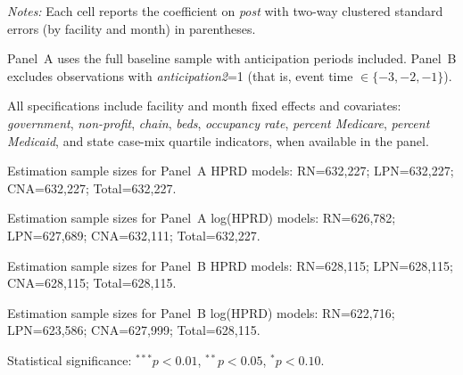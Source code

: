 \begin{table}[!ht]
\begin{threeparttable}
\begin{tablenotes}[flushleft]
\footnotesize
\item \textit{Notes:} Each cell reports the coefficient on \textit{post} with two-way clustered standard errors (by facility and month) in parentheses.
\item Panel~A uses the full baseline sample with anticipation periods included. Panel~B excludes observations with \textit{anticipation2}=1 (that is, event time $\in \{-3,-2,-1\}$).
\item All specifications include facility and month fixed effects and covariates: \textit{government}, \textit{non-profit}, \textit{chain}, \textit{beds}, \textit{occupancy rate}, \textit{percent Medicare}, \textit{percent Medicaid}, and state case-mix quartile indicators, when available in the panel.
\item Estimation sample sizes for Panel~A HPRD models: RN=632,227; LPN=632,227; CNA=632,227; Total=632,227.
\item Estimation sample sizes for Panel~A log(HPRD) models: RN=626,782; LPN=627,689; CNA=632,111; Total=632,227.
\item Estimation sample sizes for Panel~B HPRD models: RN=628,115; LPN=628,115; CNA=628,115; Total=628,115.
\item Estimation sample sizes for Panel~B log(HPRD) models: RN=622,716; LPN=623,586; CNA=627,999; Total=628,115.
\item Statistical significance: $^{***}p<0.01$, $^{**}p<0.05$, $^{*}p<0.10$.
\end{tablenotes}
\end{threeparttable}
\end{table}
\endgroup

